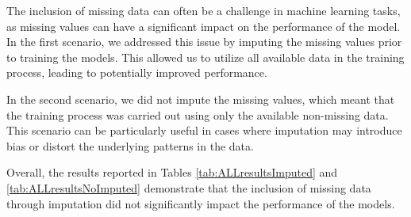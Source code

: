 The inclusion of missing data can often be a challenge in machine learning tasks, as missing values can have a significant impact on the performance of the model.
In the first scenario, we addressed this issue by imputing the missing values prior to training the models. 
This allowed us to utilize all available data in the training process, leading to potentially improved performance.

In the second scenario, we did not impute the missing values, which meant that the training process was carried out using only the available non-missing data.
This scenario can be particularly useful in cases where imputation may introduce bias or distort the underlying patterns in the data.

Overall, the results reported in Tables \ref{tab:ALLresultsImputed} and \ref{tab:ALLresultsNoImputed} demonstrate that the inclusion of missing data through imputation did not significantly impact the performance of the models.